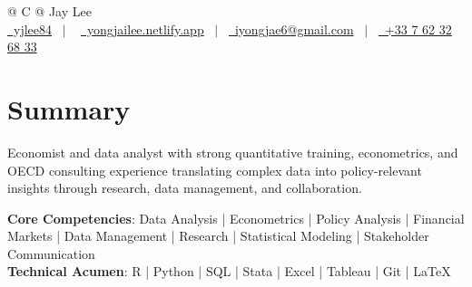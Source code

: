 \documentclass[a4paper,12pt]{article}
\begin{document}
\pagestyle{empty} 



\begin{tabularx}{\linewidth}{@{} C @{}}
\Huge{Jay Lee} \\[7.5pt]
\href{https://github.com/yjlee84}{\raisebox{-0.05\height}\faGithub\ yjlee84} \ $|$ \ 
\href{https://yongjailee.netlify.app}{\raisebox{-0.05\height}\faGlobe \ yongjailee.netlify.app} \ $|$ \ 
\href{mailto:email@mysite.com}{\raisebox{-0.05\height}\faEnvelope \ iyongjae6@gmail.com} \ $|$ \ 
\href{tel:+000000000000}{\raisebox{-0.05\height}\faMobile \ +33 7 62 32 68 33} \\
\end{tabularx}


\section{Summary}
Economist and data analyst with strong quantitative training, econometrics, and OECD consulting experience translating complex data into policy-relevant insights through research, data management, and collaboration.

\textbf{Core Competencies}: Data Analysis | Econometrics | Policy Analysis | Financial Markets | Data Management | Research | Statistical Modeling | Stakeholder Communication\\
\textbf{Technical Acumen}: R | Python | SQL | Stata | Excel | Tableau | Git | \LaTeX{}
\end{document}
